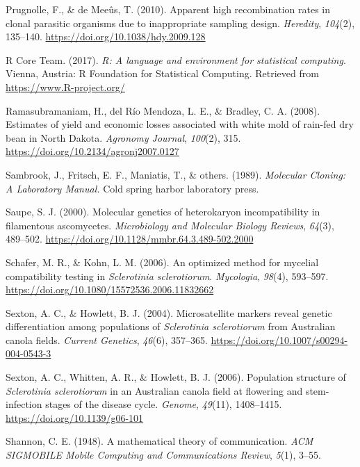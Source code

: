 \documentclass[fleqn,10pt,lineno]{wlpeerj} %
\theoremstyle{definition}
\theoremstyle{definition}
\theoremstyle{definition}
\theoremstyle{remark}
\begin{document}
\hypertarget{ref-prugnolle2010apparent}{}
Prugnolle, F., \& de Meeûs, T. (2010). Apparent high recombination rates
in clonal parasitic organisms due to inappropriate sampling design.
\emph{Heredity}, \emph{104}(2), 135--140.
\url{https://doi.org/10.1038/hdy.2009.128}

\hypertarget{ref-R}{}
R Core Team. (2017). \emph{R: A language and environment for statistical
computing}. Vienna, Austria: R Foundation for Statistical Computing.
Retrieved from \url{https://www.R-project.org/}

\hypertarget{ref-ramasubramaniam2008estimates}{}
Ramasubramaniam, H., del Río Mendoza, L. E., \& Bradley, C. A. (2008).
Estimates of yield and economic losses associated with white mold of
rain-fed dry bean in North Dakota. \emph{Agronomy Journal},
\emph{100}(2), 315. \url{https://doi.org/10.2134/agronj2007.0127}

\hypertarget{ref-sambrook1989molecular}{}
Sambrook, J., Fritsch, E. F., Maniatis, T., \& others. (1989).
\emph{Molecular Cloning: A Laboratory Manual.} Cold spring harbor
laboratory press.

\hypertarget{ref-saupe2000molecular}{}
Saupe, S. J. (2000). Molecular genetics of heterokaryon incompatibility
in filamentous ascomycetes. \emph{Microbiology and Molecular Biology
Reviews}, \emph{64}(3), 489--502.
\url{https://doi.org/10.1128/mmbr.64.3.489-502.2000}

\hypertarget{ref-schafer2006optimized}{}
Schafer, M. R., \& Kohn, L. M. (2006). An optimized method for mycelial
compatibility testing in \emph{Sclerotinia sclerotiorum}.
\emph{Mycologia}, \emph{98}(4), 593--597.
\url{https://doi.org/10.1080/15572536.2006.11832662}

\hypertarget{ref-sexton2004microsatellite}{}
Sexton, A. C., \& Howlett, B. J. (2004). Microsatellite markers reveal
genetic differentiation among populations of \emph{Sclerotinia
sclerotiorum} from Australian canola fields. \emph{Current Genetics},
\emph{46}(6), 357--365. \url{https://doi.org/10.1007/s00294-004-0543-3}

\hypertarget{ref-sexton2006population}{}
Sexton, A. C., Whitten, A. R., \& Howlett, B. J. (2006). Population
structure of \emph{Sclerotinia sclerotiorum} in an Australian canola
field at flowering and stem-infection stages of the disease cycle.
\emph{Genome}, \emph{49}(11), 1408--1415.
\url{https://doi.org/10.1139/g06-101}

\hypertarget{ref-shannon2001mathematical}{}
Shannon, C. E. (1948). A mathematical theory of communication. \emph{ACM
SIGMOBILE Mobile Computing and Communications Review}, \emph{5}(1),
3--55.
\end{document}
